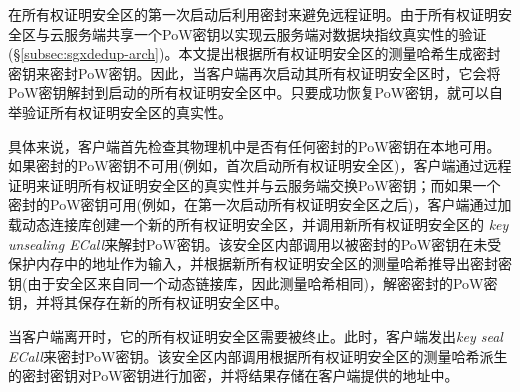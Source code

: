 \sysnameS 在所有权证明安全区的第一次启动后利用密封来避免远程证明。由于所有权证明安全区与云服务端共享一个PoW密钥以实现云服务端对数据块指纹真实性的验证(\S\ref{subsec:sgxdedup-arch})。本文提出根据所有权证明安全区的测量哈希生成密封密钥来密封PoW密钥。因此，当客户端再次启动其所有权证明安全区时，它会将PoW密钥解封到启动的所有权证明安全区中。只要成功恢复PoW密钥，就可以自举验证所有权证明安全区的真实性。

具体来说，客户端首先检查其物理机中是否有任何密封的PoW密钥在本地可用。如果密封的PoW密钥不可用(例如，首次启动所有权证明安全区)，客户端通过远程证明来证明所有权证明安全区的真实性并与云服务端交换PoW密钥；而如果一个密封的PoW密钥可用(例如，在第一次启动所有权证明安全区之后)，客户端通过加载动态连接库创建一个新的所有权证明安全区，并调用新所有权证明安全区的 \textit{key unsealing ECall}来解封PoW密钥。该安全区内部调用以被密封的PoW密钥在未受保护内存中的地址作为输入，并根据新所有权证明安全区的测量哈希推导出密封密钥(由于安全区来自同一个动态链接库，因此测量哈希相同)，解密密封的PoW密钥，并将其保存在新的所有权证明安全区中。

当客户端离开\sysnameS 时，它​​的所有权证明安全区需要被终止。此时，客户端发出\textit{key seal ECall}来密封PoW密钥。该安全区内部调用根据所有权证明安全区的测量哈希派生的密封密钥对PoW密钥进行加密，并将结果存储在客户端提供的地址中。